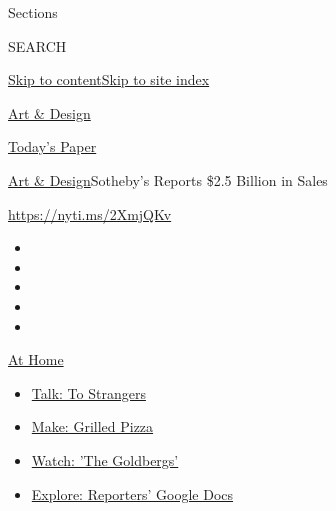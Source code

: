 Sections

SEARCH

\protect\hyperlink{site-content}{Skip to
content}\protect\hyperlink{site-index}{Skip to site index}

\href{https://www.nytimes3xbfgragh.onion/section/arts/design}{Art \&
Design}

\href{https://myaccount.nytimes3xbfgragh.onion/auth/login?response_type=cookie\&client_id=vi}{}

\href{https://www.nytimes3xbfgragh.onion/section/todayspaper}{Today's
Paper}

\href{/section/arts/design}{Art \& Design}\textbar{}Sotheby's Reports
\$2.5 Billion in Sales

\url{https://nyti.ms/2XmjQKv}

\begin{itemize}
\item
\item
\item
\item
\item
\end{itemize}

\href{https://www.nytimes3xbfgragh.onion/spotlight/at-home?action=click\&pgtype=Article\&state=default\&region=TOP_BANNER\&context=at_home_menu}{At
Home}

\begin{itemize}
\tightlist
\item
  \href{https://www.nytimes3xbfgragh.onion/2020/08/03/well/family/the-benefits-of-talking-to-strangers.html?action=click\&pgtype=Article\&state=default\&region=TOP_BANNER\&context=at_home_menu}{Talk:
  To Strangers}
\item
  \href{https://www.nytimes3xbfgragh.onion/2020/08/01/at-home/coronavirus-make-pizza-on-a-grill.html?action=click\&pgtype=Article\&state=default\&region=TOP_BANNER\&context=at_home_menu}{Make:
  Grilled Pizza}
\item
  \href{https://www.nytimes3xbfgragh.onion/2020/07/31/arts/television/goldbergs-abc-stream.html?action=click\&pgtype=Article\&state=default\&region=TOP_BANNER\&context=at_home_menu}{Watch:
  'The Goldbergs'}
\item
  \href{https://www.nytimes3xbfgragh.onion/interactive/2020/at-home/even-more-reporters-editors-diaries-lists-recommendations.html?action=click\&pgtype=Article\&state=default\&region=TOP_BANNER\&context=at_home_menu}{Explore:
  Reporters' Google Docs}
\end{itemize}

